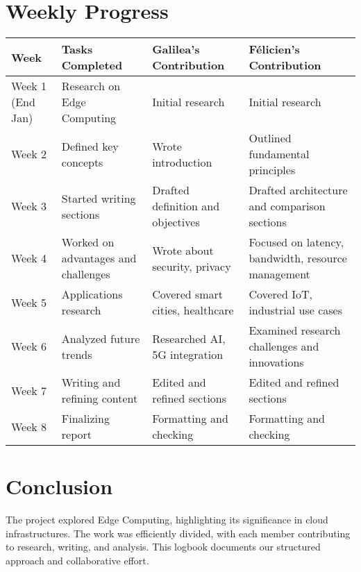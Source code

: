 \documentclass[a4paper,12pt]{article}
\begin{document}
\newpage
\section*{Weekly Progress}
\begin{longtable}{|p{3cm}|p{4cm}|p{4cm}|p{4cm}|}
\hline
\textbf{Week} & \textbf{Tasks Completed} & \textbf{Galilea's Contribution} & \textbf{Félicien's Contribution} \\
\hline
Week 1 (End Jan) & Research on Edge Computing & Initial research & Initial research \\
\hline
Week 2 & Defined key concepts & Wrote introduction & Outlined fundamental principles \\
\hline
Week 3 & Started writing sections & Drafted definition and objectives & Drafted architecture and comparison sections \\
\hline
Week 4 & Worked on advantages and challenges & Wrote about security, privacy & Focused on latency, bandwidth, resource management \\
\hline
Week 5 & Applications research & Covered smart cities, healthcare & Covered IoT, industrial use cases \\
\hline
Week 6 & Analyzed future trends & Researched AI, 5G integration & Examined research challenges and innovations \\
\hline
Week 7 & Writing and refining content & Edited and refined sections & Edited and refined sections \\
\hline
Week 8 & Finalizing report & Formatting and checking & Formatting and checking \\
\hline
\end{longtable}

\section*{Conclusion}
The project explored Edge Computing, highlighting its significance in cloud infrastructures. The work was efficiently divided, with each member contributing to research, writing, and analysis. This logbook documents our structured approach and collaborative effort.
\end{document}
